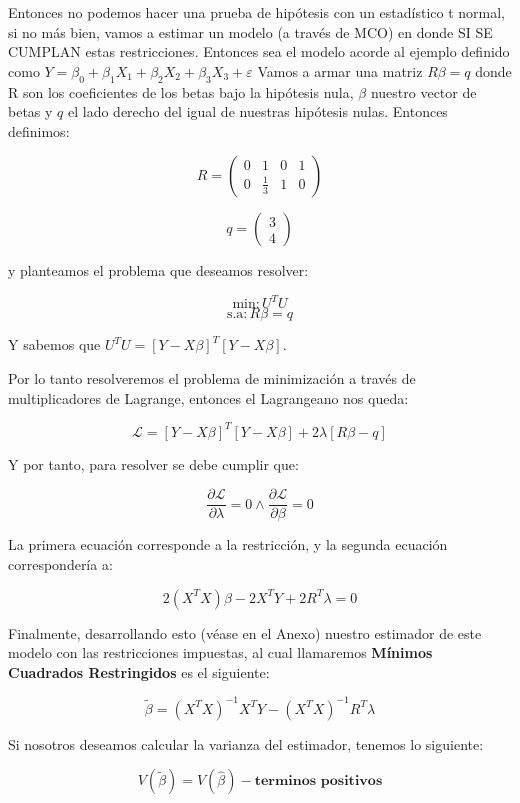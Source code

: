 \documentclass[
]{book}
\begin{document}
Entonces no podemos hacer una prueba de hipótesis con un estadístico t normal, si no más bien, vamos a estimar un modelo (a través de MCO) en donde SI SE CUMPLAN estas restricciones. Entonces sea el modelo acorde al ejemplo definido como \(Y = \beta_0 + \beta_1X_1 + \beta_2X_2 + \beta_3X_3 + \varepsilon\) Vamos a armar una matriz \(R\beta = q\) donde R son los coeficientes de los betas bajo la hipótesis nula, \(\beta\) nuestro vector de betas y \(q\) el lado derecho del igual de nuestras hipótesis nulas. Entonces definimos:

\[
R = \begin{pmatrix}
    0 & 1 & 0 & 1 \\
    0 & \frac{1}{3} & 1 & 0
\end{pmatrix}
\]

\[
q = \begin{pmatrix}
    3 \\
    4
\end{pmatrix}
\]

y planteamos el problema que deseamos resolver:

\[\text{min}: U^TU\]
\[\text{s.a}: R\beta = q\]

Y sabemos que \(U^TU = [Y - X\beta]^T[Y - X\beta]\).

Por lo tanto resolveremos el problema de minimización a través de multiplicadores de Lagrange, entonces el Lagrangeano nos queda:

\[
\mathcal{L} = [Y - X\beta]^T[Y - X\beta] + 2\lambda[R\beta-q]
\]

Y por tanto, para resolver se debe cumplir que:

\[\frac{\partial\mathcal{L}}{\partial\lambda} = 0 \land \frac{\partial\mathcal{L}}{\partial\beta} = 0\]

La primera ecuación corresponde a la restricción, y la segunda ecuación correspondería a:

\[2(X^TX)\beta - 2X^TY + 2R^T\lambda = 0\]

Finalmente, desarrollando esto (véase en el Anexo) nuestro estimador de este modelo con las restricciones impuestas, al cual llamaremos \textbf{Mínimos Cuadrados Restringidos} es el siguiente:

\[
\widetilde{\beta} = (X^TX)^{-1}X^TY - (X^TX)^{-1}R^T\lambda
\]

Si nosotros deseamos calcular la varianza del estimador, tenemos lo siguiente:

\[
V(\widetilde{\beta}) = V(\widehat{\beta}) - \textbf{terminos positivos}
\]
\end{document}
